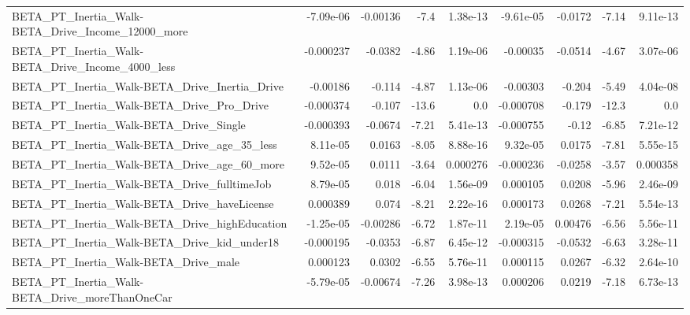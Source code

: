 \begin{tabular}{lrrrrrrrr}
BETA\_PT\_Inertia\_Walk-BETA\_Drive\_Income\_12000\_more  &   -7.09e-06 &     -0.00136 &     -7.4 & 1.38e-13 &  -9.61e-05 &     -0.0172 &        -7.14 &      9.11e-13 \\
BETA\_PT\_Inertia\_Walk-BETA\_Drive\_Income\_4000\_less   &   -0.000237 &      -0.0382 &    -4.86 & 1.19e-06 &   -0.00035 &     -0.0514 &        -4.67 &      3.07e-06 \\
BETA\_PT\_Inertia\_Walk-BETA\_Drive\_Inertia\_Drive      &    -0.00186 &       -0.114 &    -4.87 & 1.13e-06 &   -0.00303 &      -0.204 &        -5.49 &      4.04e-08 \\
BETA\_PT\_Inertia\_Walk-BETA\_Drive\_Pro\_Drive          &   -0.000374 &       -0.107 &    -13.6 &      0.0 &  -0.000708 &      -0.179 &        -12.3 &           0.0 \\
BETA\_PT\_Inertia\_Walk-BETA\_Drive\_Single             &   -0.000393 &      -0.0674 &    -7.21 & 5.41e-13 &  -0.000755 &       -0.12 &        -6.85 &      7.21e-12 \\
BETA\_PT\_Inertia\_Walk-BETA\_Drive\_age\_35\_less        &    8.11e-05 &       0.0163 &    -8.05 & 8.88e-16 &   9.32e-05 &      0.0175 &        -7.81 &      5.55e-15 \\
BETA\_PT\_Inertia\_Walk-BETA\_Drive\_age\_60\_more        &    9.52e-05 &       0.0111 &    -3.64 & 0.000276 &  -0.000236 &     -0.0258 &        -3.57 &      0.000358 \\
BETA\_PT\_Inertia\_Walk-BETA\_Drive\_fulltimeJob        &    8.79e-05 &        0.018 &    -6.04 & 1.56e-09 &   0.000105 &      0.0208 &        -5.96 &      2.46e-09 \\
BETA\_PT\_Inertia\_Walk-BETA\_Drive\_haveLicense        &    0.000389 &        0.074 &    -8.21 & 2.22e-16 &   0.000173 &      0.0268 &        -7.21 &      5.54e-13 \\
BETA\_PT\_Inertia\_Walk-BETA\_Drive\_highEducation      &   -1.25e-05 &     -0.00286 &    -6.72 & 1.87e-11 &   2.19e-05 &     0.00476 &        -6.56 &      5.56e-11 \\
BETA\_PT\_Inertia\_Walk-BETA\_Drive\_kid\_under18        &   -0.000195 &      -0.0353 &    -6.87 & 6.45e-12 &  -0.000315 &     -0.0532 &        -6.63 &      3.28e-11 \\
BETA\_PT\_Inertia\_Walk-BETA\_Drive\_male               &    0.000123 &       0.0302 &    -6.55 & 5.76e-11 &   0.000115 &      0.0267 &        -6.32 &      2.64e-10 \\
BETA\_PT\_Inertia\_Walk-BETA\_Drive\_moreThanOneCar     &   -5.79e-05 &     -0.00674 &    -7.26 & 3.98e-13 &   0.000206 &      0.0219 &        -7.18 &      6.73e-13 \\

\end{tabular}
